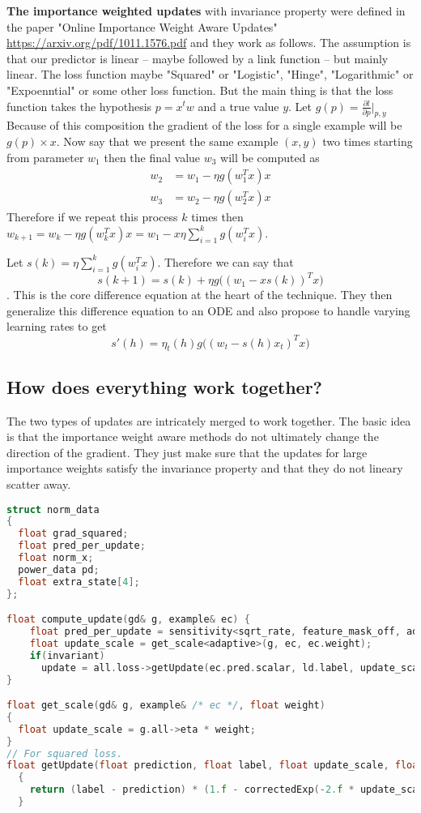 \documentclass[preview,border={30 30 30 30}]{standalone}
\begin{document}
\textbf{The importance weighted updates} with invariance property were defined in the paper "Online Importance Weight Aware Updates" \url{https://arxiv.org/pdf/1011.1576.pdf} and they work as follows. The assumption is that our predictor is linear -- maybe followed by a link function -- but mainly linear. The loss function maybe "Squared" or "Logistic", "Hinge", "Logarithmic" or "Expoenntial" or some other loss function. But the main thing is that the loss function takes the hypothesis $p = x^t w$ and a true value $y$. Let $g(p) = \frac{\partial l}{\partial p}\Big|_{p,y}$ Because of this composition the gradient of the loss for a single example will be $g(p) \times x$. Now say that we present the same example $(x,y)$ two times starting from parameter $w_1$ then the final value $w_3$ will be computed as 
\begin{align}
    w_2 &= w_1 - \eta g(w_1^T x) x \\
    w_3 &= w_2 - \eta g(w_2^T x) x 
\end{align}
Therefore if we repeat this process $k$ times then $w_{k+1} = w_k - \eta g(w_k^T x) x = w_1 - x \eta \sum_{i=1}^k g(w_i^T x) $. 

Let $s(k) =\eta \sum_{i=1}^k g(w_i^T x)$. Therefore we can say that $$s(k+1) = s(k) + \eta g\big( (w_1 - x s(k))^T x \big)$$. This is the core difference equation at the heart of the technique. They then generalize this difference equation to an ODE and also propose to handle varying learning rates to get 
\[
s'(h) = \eta_t(h) g\big( (w_t - s(h)x _t)^Tx \big)
\]
\subsection{How does everything work together?}
The two types of updates are intricately merged to work together. The basic idea is that the importance weight aware methods do not ultimately change the direction of the gradient. They just make sure that the updates for large importance weights satisfy the invariance property and that they do not lineary scatter away. 

\begin{lstlisting}[language=c++]
struct norm_data
{
  float grad_squared;
  float pred_per_update;
  float norm_x;
  power_data pd;
  float extra_state[4];
};

float compute_update(gd& g, example& ec) {
    float pred_per_update = sensitivity<sqrt_rate, feature_mask_off, adaptive, normalized, spare, false>(g, ec);
    float update_scale = get_scale<adaptive>(g, ec, ec.weight);
    if(invariant)
      update = all.loss->getUpdate(ec.pred.scalar, ld.label, update_scale, pred_per_update);
}

float get_scale(gd& g, example& /* ec */, float weight)
{
  float update_scale = g.all->eta * weight;
}
// For squared loss.
float getUpdate(float prediction, float label, float update_scale, float pred_per_update)
  {
    return (label - prediction) * (1.f - correctedExp(-2.f * update_scale * pred_per_update)) / pred_per_update;
  }
\end{lstlisting}
\end{document}
